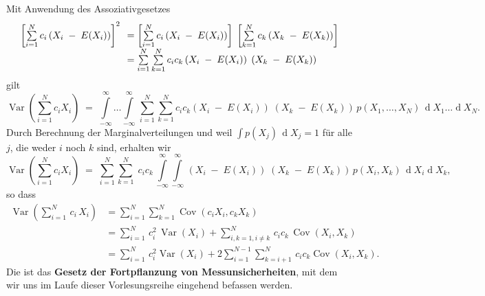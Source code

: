 Mit Anwendung des Assoziativgesetzes
$$
\arraycolsep=3.5pt\def\arraystretch{1.8}
\begin{array}{ll}
\left[ \sum\limits_{i=1}^N c_i \left(X_i \; - \; E(X_i)\right) \right]^2 & =
\left[ \sum\limits_{i=1}^N c_i \left(X_i \; - \; E(X_i)\right) \right] \;
\left[ \sum\limits_{k=1}^N c_k \left(X_k \; - \; E(X_k)\right) \right] \\
& = \sum\limits_{i=1}^N \sum\limits_{k=1}^N c_i c_k  \left(X_i \; - \; E(X_i)\right) \;
\left(X_k \; - \; E(X_k)\right) \\
\end{array}
$$
gilt
\begin{equation}
\operatorname {Var}\left(\sum _{{i=1}}^{N}c_i X_{i}\right) \; = \;
\int\limits_{-\infty}^{\infty} \dots \int\limits_{-\infty}^{\infty}
\, \sum_{i=1}^N \sum_{k=1}^N c_i c_k  \left(X_i \; - \; E(X_i)\right) \;
\left(X_k \; - \; E(X_k)\right) \, p(X_1, \dots, X_N)
\, \operatorname{d}X_1 \dots \operatorname{d}X_N .
\end{equation}
Durch Berechnung der Marginalverteilungen und weil $\int p(X_j) \, \operatorname{d}X_j = 1$
für alle $j$, die weder $i$ noch $k$ sind, erhalten wir
\begin{equation}
\operatorname {Var}\left(\sum _{{i=1}}^{N}c_i X_{i}\right) \; = \;
\sum_{i=1}^N \sum_{k=1}^N  \; c_i c_k \,
\int\limits_{-\infty}^{\infty} \int\limits_{-\infty}^{\infty}
\, \left(X_i \; - \; E(X_i)\right) \;
\left(X_k \; - \; E(X_k)\right) \, p(X_i, X_k)
\, \operatorname{d}X_i \operatorname{d}X_k ,
\end{equation}
so dass
\begin{equation}
{\begin{aligned}\operatorname {Var}\left(\sum _{{i=1}}^{N} \, c_i \, X_{i}\right) &
	= \sum _{i=1}^{N}\sum _{k=1}^{N}\operatorname {Cov}(c_i X_{i}, c_k X_{k})\\
	& = \sum _{{i=1}}^{N} \, c_i^2 \, \operatorname {Var}(X_{i})+
	\sum _{{i,k=1,i\neq k}}^{N} \, c_i c_k \,  \operatorname {Cov}(X_{i},X_{k})\\
	& = \sum _{{i=1}}^{N} \, c_i^2 \operatorname {Var}(X_{i})+2\sum _{{i=1}}^{{N-1}}
	\sum _{{k=i+1}}^{N} \, c_i c_k \operatorname {Cov}(X_{i},X_{k}).
	\end{aligned}}
\label{univarLinearFortpflanzungKap1}
\end{equation}
Die ist das \textbf{Gesetz der Fortpflanzung von Messunsicherheiten}, mit dem wir uns im Laufe
dieser Vorlesungsreihe eingehend befassen werden.

\newpage

